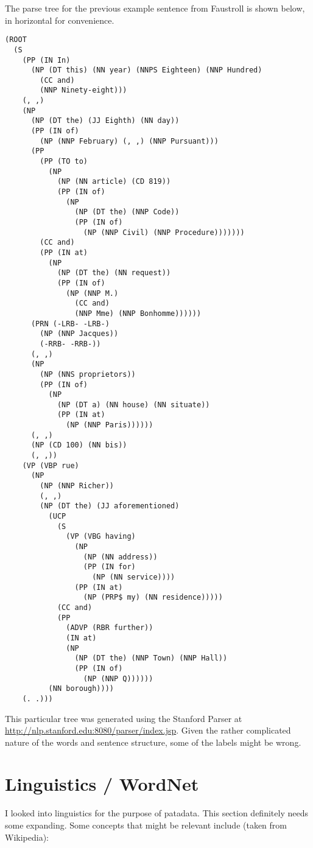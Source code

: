 The parse tree for the previous example sentence from Faustroll is shown below, in horizontal for convenience.

\begin{verbatim}
(ROOT
  (S
    (PP (IN In)
      (NP (DT this) (NN year) (NNPS Eighteen) (NNP Hundred)
        (CC and)
        (NNP Ninety-eight)))
    (, ,)
    (NP
      (NP (DT the) (JJ Eighth) (NN day))
      (PP (IN of)
        (NP (NNP February) (, ,) (NNP Pursuant)))
      (PP
        (PP (TO to)
          (NP
            (NP (NN article) (CD 819))
            (PP (IN of)
              (NP
                (NP (DT the) (NNP Code))
                (PP (IN of)
                  (NP (NNP Civil) (NNP Procedure)))))))
        (CC and)
        (PP (IN at)
          (NP
            (NP (DT the) (NN request))
            (PP (IN of)
              (NP (NNP M.)
                (CC and)
                (NNP Mme) (NNP Bonhomme))))))
      (PRN (-LRB- -LRB-)
        (NP (NNP Jacques))
        (-RRB- -RRB-))
      (, ,)
      (NP
        (NP (NNS proprietors))
        (PP (IN of)
          (NP
            (NP (DT a) (NN house) (NN situate))
            (PP (IN at)
              (NP (NNP Paris))))))
      (, ,)
      (NP (CD 100) (NN bis))
      (, ,))
    (VP (VBP rue)
      (NP
        (NP (NNP Richer))
        (, ,)
        (NP (DT the) (JJ aforementioned)
          (UCP
            (S
              (VP (VBG having)
                (NP
                  (NP (NN address))
                  (PP (IN for)
                    (NP (NN service))))
                (PP (IN at)
                  (NP (PRP$ my) (NN residence)))))
            (CC and)
            (PP
              (ADVP (RBR further))
              (IN at)
              (NP
                (NP (DT the) (NNP Town) (NNP Hall))
                (PP (IN of)
                  (NP (NNP Q))))))
          (NN borough))))
    (. .)))
\end{verbatim}

This particular tree was generated using the Stanford Parser at \url{http://nlp.stanford.edu:8080/parser/index.jsp}.
Given the rather complicated nature of the words and sentence structure, some of the labels might be wrong.

\section{Linguistics / WordNet}

I looked into linguistics for the purpose of patadata. This section definitely needs some expanding. Some concepts that might be relevant include (taken from Wikipedia):

